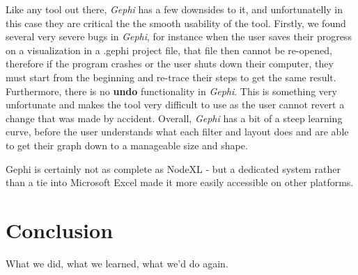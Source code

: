 \documentclass[11pt,letterpaper]{article}
\begin{document}
Like any tool out there, \textit{Gephi} has a few downsides to it, and unfortunatelly in this case they are critical the the smooth usability of the tool. Firstly, we found several very severe bugs in \textit{Gephi}, for instance when the user saves their progress on a visualization in a .gephi project file, that file then cannot be re-opened, therefore if the program crashes or the user shuts down their computer, they must start from the beginning and re-trace their steps to get the same result. Furthermore, there is no \textbf{undo} functionality in \textit{Gephi}. This is something very unfortunate and makes the tool very difficult to use as the user cannot revert a change that was made by accident. Overall, \textit{Gephi} has a bit of a steep learning curve, before the user understands what each filter and layout does and are able to get their graph down to a manageable size and shape.

Gephi is certainly not as complete as NodeXL - but a dedicated system rather than a tie into Microsoft Excel made it more easily accessible on other platforms.

\section*{Conclusion}

What we did, what we learned, what we'd do again.




\end{document}
